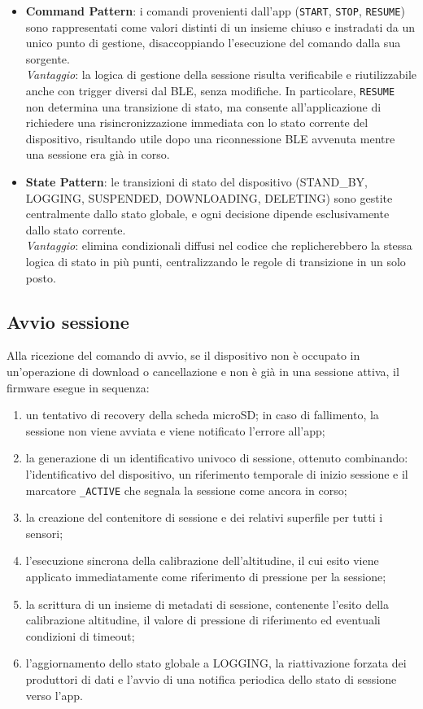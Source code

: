 \begin{itemize}
    \item \textbf{Command Pattern}: i comandi provenienti dall’app (\texttt{START}, \texttt{STOP}, \texttt{RESUME}) sono rappresentati come valori 
    distinti di un insieme chiuso e instradati da un unico punto di gestione, disaccoppiando l’esecuzione del comando dalla sua sorgente.\\
    \textit{Vantaggio}: la logica di gestione della sessione risulta verificabile e riutilizzabile anche con trigger diversi dal BLE, senza modifiche. 
    In particolare, \texttt{RESUME} non determina una transizione di stato, ma consente all’applicazione di richiedere una risincronizzazione immediata 
    con lo stato corrente del dispositivo, risultando utile dopo una riconnessione BLE avvenuta mentre una sessione era già in corso.
    \item \textbf{State Pattern}: le transizioni di stato del dispositivo (STAND\_BY, LOGGING, SUSPENDED, DOWNLOADING, DELETING) sono gestite
    centralmente dallo stato globale, e ogni decisione dipende esclusivamente dallo stato corrente.\\
    \textit{Vantaggio}: elimina condizionali diffusi nel codice che replicherebbero la stessa logica di stato in più punti, centralizzando le
    regole di transizione in un solo posto.
\end{itemize}

\subsection{Avvio sessione}

Alla ricezione del comando di avvio, se il dispositivo non è occupato in un'operazione di download o cancellazione e non è già in una sessione
attiva, il firmware esegue in sequenza:

\begin{enumerate}
    \item un tentativo di recovery della scheda microSD; in caso di fallimento, la sessione non viene avviata e viene notificato l'errore all'app;
    \item la generazione di un identificativo univoco di sessione, ottenuto combinando: l'identificativo del dispositivo, un riferimento temporale di
    inizio sessione e il marcatore \texttt{\_ACTIVE} che segnala la sessione come ancora in corso;
    \item la creazione del contenitore di sessione e dei relativi superfile per tutti i sensori;
    \item l'esecuzione sincrona della calibrazione dell'altitudine, il cui esito viene applicato immediatamente come riferimento di pressione per la 
    sessione;
    \item la scrittura di un insieme di metadati di sessione, contenente l'esito della calibrazione altitudine, il valore di pressione di
    riferimento ed eventuali condizioni di timeout;
    \item l'aggiornamento dello stato globale a LOGGING, la riattivazione forzata dei produttori di dati e l'avvio di una notifica periodica dello stato 
    di sessione verso l'app.
\end{enumerate}

